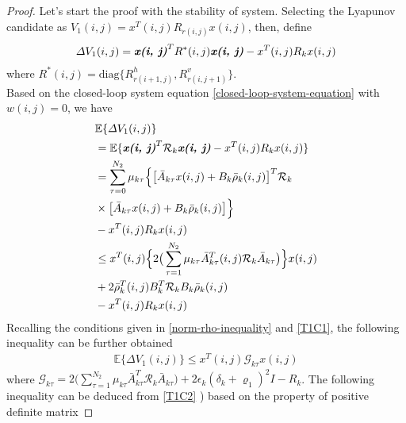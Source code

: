 \documentclass[journal,final,twocolumn]{IEEEtran}
\begin{document}
\begin{proof}
	Let's start the proof with the stability of system. Selecting the Lyapunov candidate as $V_{1}(i,j) = x^{T}(i,j)R_{r(i,j)}x(i,j)$, then, define 
	\begin{equation}\label{VAR-DELTA-V1}
		\begin{split}
			\varDelta V_{1}(i,j) = \emph{\textbf{x(i, j)}}^{T} R^{*}(i,j) \emph{\textbf{x(i, j)}} - x^{T}(i,j)R_{k}x(i,j)
		\end{split}
	\end{equation}
	where $R^{*}(i,j)=\mathrm{diag}\{R^{h}_{r(i+1,j)},R^{v}_{r(i,j+1)}\}$.\\
	Based on the closed-loop system equation \eqref{closed-loop-system-equation} with $w(i,j)=0$, we have 
	\begin{equation}
	\begin{split}
	&\mathbb{E}\{\varDelta V_{1}(i,j) \}\\
	&=\mathbb{E}\{\emph{\textbf{x(i, j)}}^{T}\mathcal{R}_{k}\emph{\textbf{x(i, j)}} - x^{T}(i,j)R_{k}x(i,j) \} \\
	&=  \sum_{\tau =0}^{N_{2}}\mu_{k\tau }\Big\{\big[\bar{A}_{k\tau }x(i,j)+B_{k}\bar{\rho}_{k}(i,j)\big]^{T}\mathcal{R}_{k}\\
	&\times\big[\bar{A}_{k\tau }x(i,j)+B_{k}\bar{\rho}_{k}(i,j)\big]\Big\}\\
	&- x^{T}(i,j)R_{k}x(i,j) \\
	&\leq x^{T}(i,j) \Big\{2\big(\sum_{\tau =1}^{N_{2}}\mu_{k\tau }\bar{A}^{T}_{k\tau }(i,j)\mathcal{R}_{k}\bar{A}_{k\tau }\big)\Big\}x(i,j)\\ &+2\bar{\rho}^{T}_{k}(i,j)B^{T}_{k}\mathcal{R}_{k}B_{k}\bar{\rho}_{k}(i,j) \\
	&-  x^{T}(i,j)R_{k}x(i,j)
	\end{split}
	\end{equation}
	Recalling the conditions given in \eqref{norm-rho-inequality} and \eqref{T1C1}, the following inequality can be further obtained
	\begin{equation}\label{combine-one-1}
	\begin{split}
		\mathbb{E}\{\varDelta  V_{1}(i,j) \} \leq x^{T}(i,j)\mathcal{G}_{k\tau }x(i,j)
	\end{split}
	\end{equation}
	where $\mathcal{G}_{k\tau }= 2\big(\sum_{\tau =1}^{N_{2}}\mu_{k\tau }\bar{A}^{T}_{k\tau }\mathcal{R}_{k}\bar{A}_{k\tau }\big)
	+ 2\epsilon_{k}(\delta_{k}+\varrho_{1})^{2}I- R_{k}$.
	The following inequality can be deduced from \eqref{T1C2} ) based on the property of positive definite matrix

\end{proof}
\end{document}
